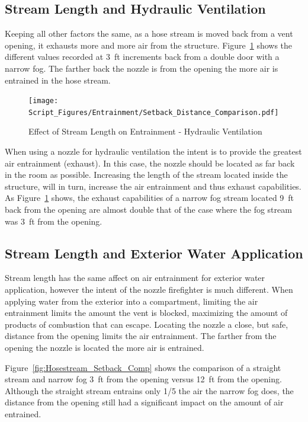 \documentclass[12pt,oneside]{book}
\begin{document}
\subsection{Stream Length and Hydraulic Ventilation}
Keeping all other factors the same, as a hose stream is moved back from a vent opening, it exhausts more and more air from the structure. Figure~\ref{fig:Setback} shows the different values recorded at 3~ft increments back from a double door with a narrow fog. The farther back the nozzle is from the opening the more air is entrained in the hose stream. 

\begin{figure}[H]
\centering
\texttt{[image: Script\_Figures/Entrainment/Setback\_Distance\_Comparison.pdf]}
\caption{Effect of Stream Length on Entrainment - Hydraulic Ventilation}
\label{fig:Setback}
\end{figure}

When using a nozzle for hydraulic ventilation the intent is to provide the greatest air entrainment (exhaust). In this case, the nozzle should be located as far back in the room as possible. Increasing the length of the stream located inside the structure, will in turn, increase the air entrainment and thus exhaust capabilities. As Figure~\ref{fig:Setback} shows, the exhaust capabilities of a narrow fog stream located 9~ft back from the opening are almost double that of the case where the fog stream was 3~ft from the opening. 

\subsection{Stream Length and Exterior Water Application}
Stream length has the same affect on air entrainment for exterior water application, however the intent of the nozzle firefighter is much different. When applying water from the exterior into a compartment, limiting the air entrainment limits the amount the vent is blocked, maximizing the amount of products of combustion that can escape. Locating the nozzle a close, but safe, distance from the opening limits the air entrainment. The farther from the opening the nozzle is located the more air is entrained. 

Figure~\ref{fig:Hosestream_Setback_Comp} shows the comparison of a straight stream and narrow fog 3~ft from the opening versus 12~ft from the opening. Although the straight stream entrains only 1/5 the air the narrow fog does, the distance from the opening still had a significant impact on the amount of air entrained.
\end{document}
